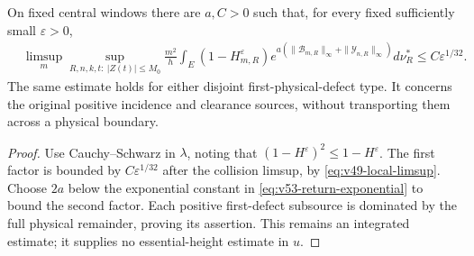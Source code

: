 \begin{corollary}
\label{cor:v53-exponential-defect}
On fixed central windows there are $a,C>0$ such that, for every fixed
sufficiently small $\varepsilon>0$,
\begin{align}
 &\limsup_m\sup_{R,n,k,t:\ |Z(t)|\le M_0}\frac{m^2}{h}
 \int_E(1-H_{m,R}^{\varepsilon})
 e^{a(\|\mathcal B_{m,R}\|_\infty+\|\mathcal Y_{n,R}\|_\infty)}d\nu_R^*
                                  \le C\varepsilon^{1/32}.
                                      \label{eq:v53-exponential-defect}
\end{align}
The same estimate holds for either disjoint first-physical-defect type.
It concerns the original positive incidence and clearance sources,
without transporting them across a physical boundary.
\end{corollary}
\begin{proof}
Use Cauchy--Schwarz in $\lambda$, noting that
$(1-H^{\varepsilon})^2\le1-H^{\varepsilon}$. The first factor is
bounded by $C\varepsilon^{1/32}$ after the collision limsup, by
\eqref{eq:v49-local-limsup}. Choose $2a$ below the exponential
constant in \eqref{eq:v53-return-exponential} to bound the second
factor. Each positive first-defect subsource is dominated by the
full physical remainder, proving its assertion. This remains an
integrated estimate; it supplies no essential-height estimate in $u$.
\end{proof}
